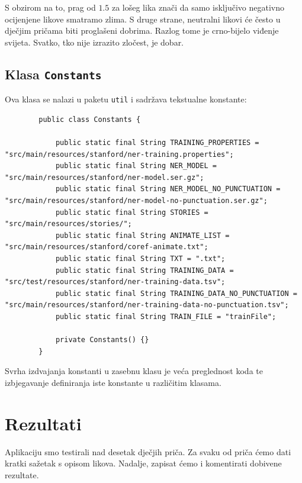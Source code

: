 \documentclass[a4paper,twoside,12pt]{memoir} %
\begin{document}
		S obzirom na to, prag od $1.5$ za lošeg lika znači da samo isključivo negativno ocijenjene likove smatramo zlima. S druge strane, neutralni likovi će često u dječjim pričama biti proglašeni dobrima. Razlog tome je crno-bijelo viđenje svijeta. Svatko, tko nije izrazito zločest, je dobar.
\newpage
	\section{Klasa \texttt{Constants}}

		Ova klasa se nalazi u paketu \texttt{util} i sadržava tekstualne konstante:

		\begin{lstlisting}
		public class Constants {

			public static final String TRAINING_PROPERTIES = "src/main/resources/stanford/ner-training.properties";
			public static final String NER_MODEL = "src/main/resources/stanford/ner-model.ser.gz";
			public static final String NER_MODEL_NO_PUNCTUATION = "src/main/resources/stanford/ner-model-no-punctuation.ser.gz";
			public static final String STORIES = "src/main/resources/stories/";
			public static final String ANIMATE_LIST = "src/main/resources/stanford/coref-animate.txt";
			public static final String TXT = ".txt";
			public static final String TRAINING_DATA = "src/test/resources/stanford/ner-training-data.tsv";
			public static final String TRAINING_DATA_NO_PUNCTUATION = "src/main/resources/stanford/ner-training-data-no-punctuation.tsv";
			public static final String TRAIN_FILE = "trainFile";

			private Constants() {}
		}
		\end{lstlisting}

		Svrha izdvajanja konstanti u zasebnu klasu je veća preglednost koda te izbjegavanje definiranja iste konstante u različitim klasama.

	\chapter{Rezultati}


		Aplikaciju smo testirali nad desetak dječjih priča. Za svaku od priča ćemo dati kratki sažetak s opisom likova. Nadalje, zapisat ćemo i komentirati dobivene rezultate.
\end{document}

